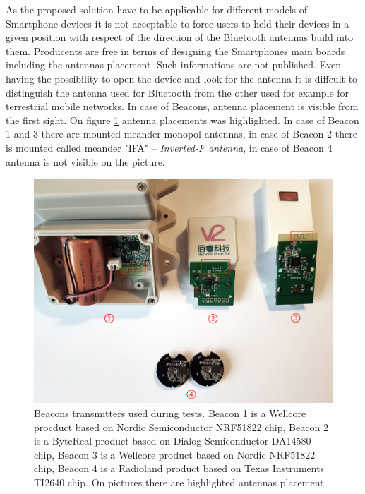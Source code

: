 \documentclass[../main.tex]{subfiles}
\begin{document}
As the proposed solution have to be applicable for different models of Smartphone devices it is not acceptable to force users to held their devices in a given position with respect of the direction of the Bluetooth antennas build into them. Producents are free in terms of designing the Smartphones main boards including the antennas placement. Such informations are not published. Even having the possibility to open the device and look for the antenna it is diffcult to distinguish the antenna used for Bluetooth from the other used for example for terrestrial mobile networks. In case of Beacons, antenna placement is visible from the first sight. On figure \ref{fig:beacons_used_in_tests} antenna placements was highlighted. In case of Beacon 1 and 3 there are mounted meander monopol antennas, in case of Beacon 2 there is mounted called meander "IFA" -- \textit{Inverted-F antenna}, in case of Beacon 4 antenna is not visible on the picture.

\begin{figure}[ht]
\includegraphics[width=\textwidth, keepaspectratio]{pictures/beacons_used_in_tests.pdf}
\centering
\caption{Beacons transmitters used during tests. Beacon 1 is a Wellcore procduct based on Nordic Semiconductor NRF51822 chip, Beacon 2 is a ByteReal product based on Dialog Semiconductor DA14580 chip, Beacon 3 is a Wellcore product based on Nordic NRF51822 chip, Beacon 4 is a Radioland product based on Texas Instruments TI2640 chip. On pictures there are highlighted antennas placement.}
\label{fig:beacons_used_in_tests}
\end{figure}
\end{document}
